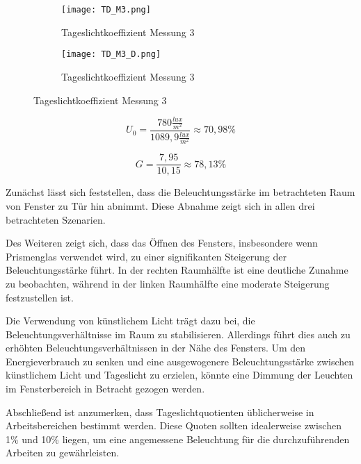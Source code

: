   \begin{figure}[H]
  \centering
  \begin{subfigure}[c]{0.5\textwidth}
      \texttt{[image: TD\_M3.png]}
      \caption{Tageslichtkoeffizient Messung 3}
      \label{fig:Tageslichtkoeffizient Messung 3}
  \end{subfigure}
  \hfill
  \begin{subfigure}[c]{0.45\textwidth}
      \texttt{[image: TD\_M3\_D.png]}
      \caption{Tageslichtkoeffizient Messung 3}
      \label{fig:Tageslichtkoeffizient Messung 3 Draufsicht}
  \end{subfigure}
  \label{fig:Messung 3 Tageslichtkoeffizient}
  \end{figure}

  $$U_0 = \frac{780\frac{lux}{m^2}}{1089,9\frac{lux}{m^2}}\approx 70,98\%$$

  $$G = \frac{7,95}{10,15}\approx 78,13\%$$

  Zunächst lässt sich feststellen, dass die Beleuchtungsstärke im betrachteten Raum von Fenster zu Tür hin abnimmt. Diese Abnahme zeigt sich in allen drei betrachteten Szenarien.

Des Weiteren zeigt sich, dass das Öffnen des Fensters, insbesondere wenn Prismenglas verwendet wird, zu einer signifikanten Steigerung der Beleuchtungsstärke führt. In der rechten Raumhälfte ist eine deutliche Zunahme zu beobachten, während in der linken Raumhälfte eine moderate Steigerung festzustellen ist.

Die Verwendung von künstlichem Licht trägt dazu bei, die Beleuchtungsverhältnisse im Raum zu stabilisieren. Allerdings führt dies auch zu erhöhten Beleuchtungsverhältnissen in der Nähe des Fensters. Um den Energieverbrauch zu senken und eine ausgewogenere Beleuchtungsstärke zwischen künstlichem Licht und Tageslicht zu erzielen, könnte eine Dimmung der Leuchten im Fensterbereich in Betracht gezogen werden.

Abschließend ist anzumerken, dass Tageslichtquotienten üblicherweise in Arbeitsbereichen bestimmt werden. Diese Quoten sollten idealerweise zwischen 1\% und 10\% liegen, um eine angemessene Beleuchtung für die durchzuführenden Arbeiten zu gewährleisten.